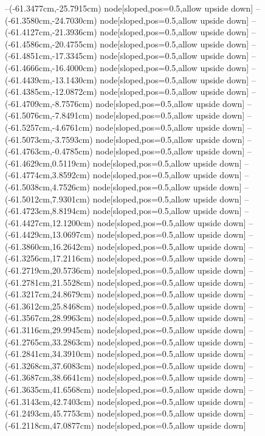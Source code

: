 --(-61.3477cm,-25.7915cm) node[sloped,pos=0.5,allow upside down]{\ArrowIn}
--(-61.3580cm,-24.7030cm) node[sloped,pos=0.5,allow upside down]{\ArrowIn}
--(-61.4127cm,-21.3936cm) node[sloped,pos=0.5,allow upside down]{\ArrowIn}
--(-61.4586cm,-20.4755cm) node[sloped,pos=0.5,allow upside down]{\arrowIn}
--(-61.4851cm,-17.3345cm) node[sloped,pos=0.5,allow upside down]{\ArrowIn}
--(-61.4666cm,-16.4000cm) node[sloped,pos=0.5,allow upside down]{\arrowIn}
--(-61.4439cm,-13.1430cm) node[sloped,pos=0.5,allow upside down]{\ArrowIn}
--(-61.4385cm,-12.0872cm) node[sloped,pos=0.5,allow upside down]{\ArrowIn}
--(-61.4709cm,-8.7576cm) node[sloped,pos=0.5,allow upside down]{\ArrowIn}
--(-61.5076cm,-7.8491cm) node[sloped,pos=0.5,allow upside down]{\arrowIn}
--(-61.5257cm,-4.6761cm) node[sloped,pos=0.5,allow upside down]{\ArrowIn}
--(-61.5073cm,-3.7593cm) node[sloped,pos=0.5,allow upside down]{\arrowIn}
--(-61.4763cm,-0.4785cm) node[sloped,pos=0.5,allow upside down]{\ArrowIn}
--(-61.4629cm,0.5119cm) node[sloped,pos=0.5,allow upside down]{\arrowIn}
--(-61.4774cm,3.8592cm) node[sloped,pos=0.5,allow upside down]{\ArrowIn}
--(-61.5038cm,4.7526cm) node[sloped,pos=0.5,allow upside down]{\arrowIn}
--(-61.5012cm,7.9301cm) node[sloped,pos=0.5,allow upside down]{\ArrowIn}
--(-61.4723cm,8.8194cm) node[sloped,pos=0.5,allow upside down]{\arrowIn}
--(-61.4427cm,12.1200cm) node[sloped,pos=0.5,allow upside down]{\ArrowIn}
--(-61.4429cm,13.0697cm) node[sloped,pos=0.5,allow upside down]{\arrowIn}
--(-61.3860cm,16.2642cm) node[sloped,pos=0.5,allow upside down]{\ArrowIn}
--(-61.3256cm,17.2116cm) node[sloped,pos=0.5,allow upside down]{\arrowIn}
--(-61.2719cm,20.5736cm) node[sloped,pos=0.5,allow upside down]{\ArrowIn}
--(-61.2781cm,21.5528cm) node[sloped,pos=0.5,allow upside down]{\arrowIn}
--(-61.3217cm,24.8679cm) node[sloped,pos=0.5,allow upside down]{\ArrowIn}
--(-61.3612cm,25.8468cm) node[sloped,pos=0.5,allow upside down]{\arrowIn}
--(-61.3567cm,28.9963cm) node[sloped,pos=0.5,allow upside down]{\ArrowIn}
--(-61.3116cm,29.9945cm) node[sloped,pos=0.5,allow upside down]{\arrowIn}
--(-61.2765cm,33.2863cm) node[sloped,pos=0.5,allow upside down]{\ArrowIn}
--(-61.2841cm,34.3910cm) node[sloped,pos=0.5,allow upside down]{\ArrowIn}
--(-61.3268cm,37.6083cm) node[sloped,pos=0.5,allow upside down]{\ArrowIn}
--(-61.3687cm,38.6641cm) node[sloped,pos=0.5,allow upside down]{\ArrowIn}
--(-61.3635cm,41.6568cm) node[sloped,pos=0.5,allow upside down]{\ArrowIn}
--(-61.3143cm,42.7403cm) node[sloped,pos=0.5,allow upside down]{\ArrowIn}
--(-61.2493cm,45.7753cm) node[sloped,pos=0.5,allow upside down]{\ArrowIn}
--(-61.2118cm,47.0877cm) node[sloped,pos=0.5,allow upside down]{\ArrowIn}
